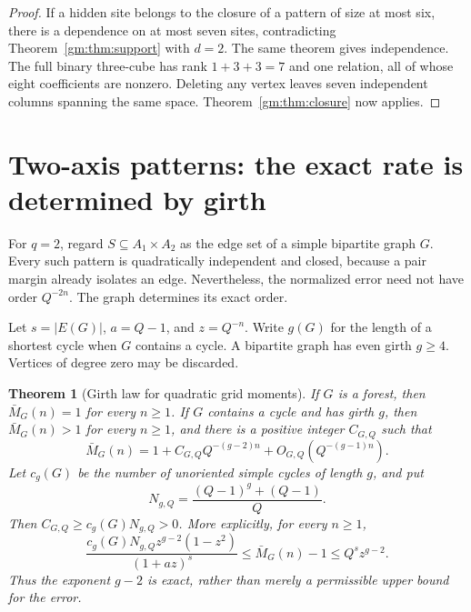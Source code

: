 \documentclass[11pt,a4paper]{article}
\numberwithin{equation}{section}
\newtheorem{theorem}{Theorem}[section]
\theoremstyle{definition}
\theoremstyle{remark}
\newcommand{\1}{\mathbf 1}
\begin{document}
\begin{proof}
If a hidden site belongs to the closure of a pattern of size at most six,
there is a dependence on at most seven sites, contradicting
Theorem~\ref{gm:thm:support} with $d=2$. The same theorem gives independence.
The full binary three-cube has rank $1+3+3=7$ and one relation, all of whose
eight coefficients are nonzero. Deleting any vertex leaves seven
independent columns spanning the same space. Theorem~\ref{gm:thm:closure}
now applies.
\end{proof}

\section{Two-axis patterns: the exact rate is determined by girth}
\label{gm:sec:girth}

For $q=2$, regard $S\subseteq A_1\times A_2$ as the edge set of a simple
bipartite graph $G$. Every such pattern is quadratically independent and
closed, because a pair margin already isolates an edge. Nevertheless,
the normalized error need not have order $Q^{-2n}$. The graph determines
its exact order.

Let $s=|E(G)|$, $a=Q-1$, and $z=Q^{-n}$. Write $g(G)$ for the length of a
shortest cycle when $G$ contains a cycle. A bipartite graph has even girth
$g\geq4$. Vertices of degree zero may be discarded.

\begin{theorem}[Girth law for quadratic grid moments]
\label{gm:thm:girth}
If $G$ is a forest, then $\bar M_G(n)=1$ for every $n\geq1$.
If $G$ contains a cycle and has girth $g$, then $\bar M_G(n)>1$ for every
$n\geq1$, and there is a positive integer $C_{G,Q}$ such that
\begin{equation}\label{gm:eq:girth-asymptotic}
 \bar M_G(n)=1+C_{G,Q}Q^{-(g-2)n}
                +O_{G,Q}(Q^{-(g-1)n}).
\end{equation}
Let $c_g(G)$ be the number of unoriented simple cycles of length $g$, and
put
\begin{equation}\label{gm:eq:cycle-zero-count}
 N_{g,Q}=\frac{(Q-1)^g+(Q-1)}{Q}.
\end{equation}
Then $C_{G,Q}\geq c_g(G)N_{g,Q}>0$. More explicitly, for every $n\geq1$,
\begin{equation}\label{gm:eq:girth-finite-bounds}
 \frac{c_g(G)N_{g,Q}z^{g-2}(1-z^2)}{(1+az)^s}
 \leq\bar M_G(n)-1\leq Q^s z^{g-2}.
\end{equation}
Thus the exponent $g-2$ is exact, rather than merely a permissible upper
bound for the error.
\end{theorem}
\end{document}
